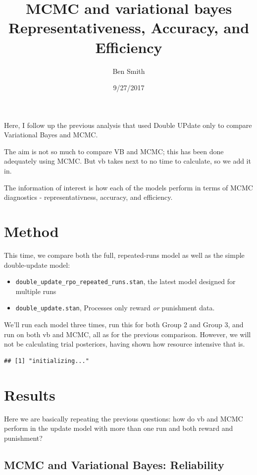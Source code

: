 \documentclass[]{article}
\title{MCMC and variational bayes Representativeness, Accuracy, and Efficiency}
\author{Ben Smith}
\date{9/27/2017}
\providecommand{\tightlist}{%
  \setlength{\itemsep}{0pt}\setlength{\parskip}{0pt}}
\begin{document}
\maketitle

Here, I follow up the previous analysis that used Double UPdate only to
compare Variational Bayes and MCMC.

The aim is not so much to compare VB and MCMC; this has been done
adequately using MCMC. But vb takes next to no time to calculate, so we
add it in.

The information of interest is how each of the models perform in terms
of MCMC diagnostics - representativness, accuracy, and efficiency.

\section{Method}\label{method}

This time, we compare both the full, repeated-runs model as well as the
simple double-update model:

\begin{itemize}
\tightlist
\item
  \texttt{double\_update\_rpo\_repeated\_runs.stan}, the latest model
  designed for multiple runs
\item
  \texttt{double\_update.stan}, Processes only reward \emph{or}
  punishment data.
\end{itemize}

We'll run each model three times, run this for both Group 2 and Group 3,
and run on both vb and MCMC, all as for the previous comparison.
However, we will not be calculating trial posteriors, having shown how
resource intensive that is.

\begin{verbatim}
## [1] "initializing..."
\end{verbatim}

\section{Results}\label{results}

Here we are basically repeating the previous questions: how do vb and
MCMC perform in the update model with more than one run and both reward
and punishment?

\subsection{MCMC and Variational Bayes:
Reliability}\label{mcmc-and-variational-bayes-reliability}
\end{document}
